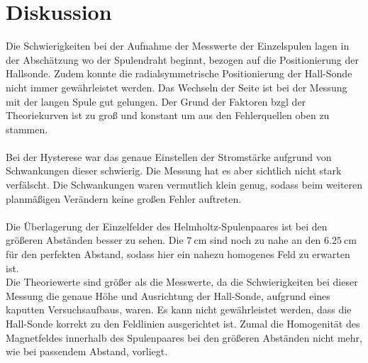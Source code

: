 \section{Diskussion}
\label{sec:Diskussion}
Die Schwierigkeiten bei der Aufnahme der Messwerte der Einzelspulen lagen in der
Abschätzung wo der Spulendraht beginnt, bezogen auf die Positionierung der Hallsonde.
Zudem konnte die radialsymmetrische Positionierung der Hall-Sonde nicht immer
gewährleistet werden. Das Wechseln der Seite ist bei der Messung mit der langen
Spule gut gelungen. Der Grund der Faktoren bzgl der Theoriekurven ist zu groß und
konstant um aus den Fehlerquellen oben zu stammen.
\\\\
Bei der Hysterese war das genaue Einstellen der Stromstärke aufgrund von
Schwankungen dieser schwierig. Die Messung hat es aber sichtlich nicht stark verfälscht.
Die Schwankungen waren vermutlich klein genug, sodass beim weiteren planmäßigen
Verändern keine großen Fehler auftreten.
\\\\
Die Überlagerung der Einzelfelder des Helmholtz-Spulenpaares ist bei den größeren
Abständen besser zu sehen.
Die $\SI{7}{\centi\metre}$ sind noch zu nahe an den $\SI{6.25}{\centi\metre}$
für den perfekten Abstand, sodass hier ein nahezu homogenes Feld zu erwarten ist.
\\
Die Theoriewerte sind größer als die Messwerte, da die
Schwierigkeiten bei dieser Messung die genaue Höhe und Ausrichtung der
Hall-Sonde, aufgrund eines kaputten Versuchsaufbaus, waren.
Es kann nicht gewährleistet werden, dass die Hall-Sonde korrekt zu den Feldlinien
ausgerichtet ist. Zumal die Homogenität des Magnetfeldes innerhalb des Spulenpaares
bei den größeren Abständen nicht mehr, wie bei passendem Abstand,
vorliegt.\\
